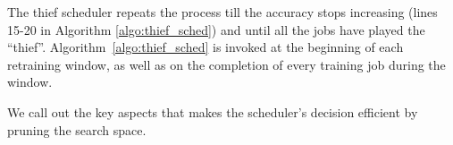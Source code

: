 The thief scheduler repeats the process till the accuracy stops increasing (lines 15-20 in Algorithm \ref{algo:thief_sched}) and until all the jobs have played the ``thief''. 
Algorithm~\ref{algo:thief_sched} is invoked at the beginning of each retraining window, as well as on the completion of every training job during the window.%


%





We call out the key aspects that makes the scheduler's decision efficient by pruning the search space. %

